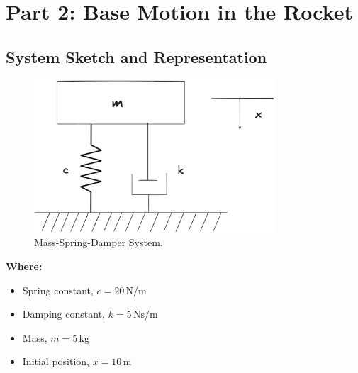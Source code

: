 \documentclass[12pt,a4paper]{article}
\begin{document}
\section{Part 2: Base Motion in the Rocket}

\subsection{System Sketch and Representation}
\begin{figure}[H]
    \centering
    \includegraphics[width=0.8\textwidth]{msd.png} 
    \caption{Mass-Spring-Damper System.}
    \label{fig:system}
\end{figure}
\textbf{Where:}
\begin{itemize}
    \item Spring constant, \(c = 20 \, \text{N/m}\)
    \item Damping constant, \(k = 5 \, \text{Ns/m}\)
    \item Mass, \(m = 5 \, \text{kg}\)
    \item Initial position, \(x = 10 \, \text{m}\)
\end{itemize}
\end{document}
